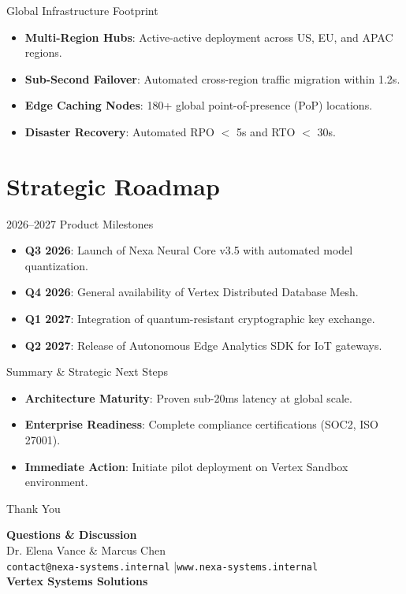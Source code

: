 \documentclass[style=fyma,palette=blue]{powerdot}
\begin{document}
\begin{slide}{Global Infrastructure Footprint}
\begin{itemize}
  \item \textbf{Multi-Region Hubs}: Active-active deployment across US, EU, and APAC regions.
  \item \textbf{Sub-Second Failover}: Automated cross-region traffic migration within 1.2s.
  \item \textbf{Edge Caching Nodes}: 180+ global point-of-presence (PoP) locations.
  \item \textbf{Disaster Recovery}: Automated RPO $<$ 5s and RTO $<$ 30s.
\end{itemize}
\end{slide}

\section{Strategic Roadmap}

\begin{slide}{2026--2027 Product Milestones}
\begin{itemize}
  \item \textbf{Q3 2026}: Launch of Nexa Neural Core v3.5 with automated model quantization.
  \item \textbf{Q4 2026}: General availability of Vertex Distributed Database Mesh.
  \item \textbf{Q1 2027}: Integration of quantum-resistant cryptographic key exchange.
  \item \textbf{Q2 2027}: Release of Autonomous Edge Analytics SDK for IoT gateways.
\end{itemize}
\end{slide}

\begin{slide}{Summary \& Strategic Next Steps}
\begin{itemize}
  \item \textbf{Architecture Maturity}: Proven sub-20ms latency at global scale.
  \item \textbf{Enterprise Readiness}: Complete compliance certifications (SOC2, ISO 27001).
  \item \textbf{Immediate Action}: Initiate pilot deployment on Vertex Sandbox environment.
\end{itemize}
\end{slide}

\begin{slide}{Thank You}
\begin{center}
\Huge \textbf{Questions \& Discussion}\\[0.5cm]
\large Dr. Elena Vance \& Marcus Chen\\[0.2cm]
\normalsize \texttt{contact@nexa-systems.internal} \quad|\quad \texttt{www.nexa-systems.internal}\\[0.3cm]
\small \textbf{Vertex Systems Solutions}
\end{center}
\end{slide}
\end{document}
